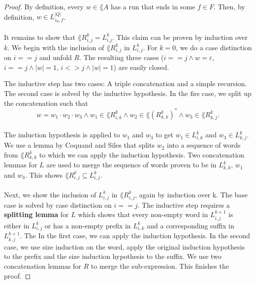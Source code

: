 \begin{proof}
    By definition, every $w \in \lang{A}$ has a run that ends in some $f \in F$. 
    Then, by definition, $w \in  L^{|Q|}_{s_0, f}$. 

    \paragraph{}
    It remains to show that $\lang{R^k_{i,j}} = L^k_{i.j}$. 
    This claim can be proven by induction over $k$. 
    We begin with the inclusion of $\lang{R^k_{i,j}}$ in $L^k_{i,j}$. 
    For $k=0$, we do a case distinction on $i==j$ and unfold $R$. 
    The resulting three cases ($i==j \wedge w=\varepsilon$, $i==j \wedge |w|=1$, $i<>j \wedge |w|=1$) are easily closed. 

    The inductive step has two cases: A triple concatenation and a simple recursion. 
    The second case is solved by the inductive hypothesis.
    In the firs case, we split up the concatenation such that
    \begin{equation*}
        w = w_1 \cdot w_2 \cdot w_3 
        \wedge w_1 \in \lang{R^k_{i,k}} 
        \wedge w_2 \in \lang{(R^k_{k,k})^*} 
        \wedge w_3 \in \lang{R^k_{k,j}}.                               
    \end{equation*}
    \paragraph{}
    The induction hypothesis is applied to $w_1$ and $w_3$ to get $w_1 \in L^k_{i,k}$ and $w_3 \in L^k_{k,j}$.
    We use a lemma by Coquand and Siles that splits $w_2$ into a sequence of words from $\lang{R^k_{k,k}}$ to which we can apply the induction hypothesis. 
    Two concatenation lemmas for $L$ are used to merge the sequence of words proven to be in $L^k_{k,k}$,
    $w_1$ and $w_3$. This shows $\lang{R^k_{i,j}} \subseteq L^k_{i,j}$.

    \paragraph{}
    Next, we show the inclusion of $L^k_{i,j}$ in $\lang{R^k_{i,j}}$, again by induction over k. 
    The base case is solved by case distinction on $i==j$. 
    The inductive step requires a \textbf{splitting lemma} for $L$ which shows that every non-empty word in $L^{k+1}_{i,j}$ is either in $L^k_{i,j}$ or has a non-empty prefix in $L^k_{i,k}$ and a corresponding suffix in $L^{k+1}_{k,j}$.
    The 
    In the first case, we can apply the induction hypothesis. 
    In the second case, we use size induction on the word, apply the original induction hypothesis to the prefix and the size induction hypothesis to the suffix. 
    We use two concatenation lemmas for $R$ to merge the sub-expression. 
    This finishes the proof.
\end{proof}

